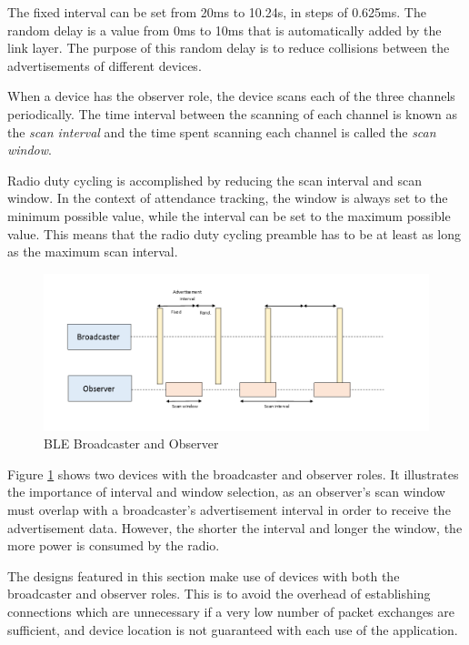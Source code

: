     The fixed interval can be set from 20ms to 10.24s, in steps of 0.625ms. The
    random delay is a value from 0ms to 10ms that is automatically added by the
    link layer. The purpose of this random delay is to reduce collisions between
    the advertisements of different devices.

    When a device has the observer role, the device scans each of the three
    channels periodically. The time interval between the scanning of each channel
    is known as the \textit{scan interval} and the time spent scanning each
    channel is called the \textit{scan window}.

    Radio duty cycling is accomplished by reducing the scan interval and scan window.
    In the context of attendance tracking, the window is always set to the minimum
    possible value, while the interval can be set to the maximum possible value. This
    means that the radio duty cycling preamble has to be at least as long
    as the maximum scan interval.

    \FloatBarrier
    \begin{figure}[ht]
      \includegraphics[width=\textwidth]{Images/chapter3/ble_intervals.png}
      \caption{BLE Broadcaster and Observer}
      \label{fig:intervals}
    \end{figure}
    \FloatBarrier

    Figure \ref{fig:intervals} shows two devices with the broadcaster and observer
    roles. It illustrates the importance of interval and window selection, as an
    observer's scan window must overlap with a broadcaster's advertisement
    interval in order to receive the advertisement data. However, the shorter
    the interval and longer the window, the more power is consumed by the radio.

    The designs featured in this section make use of devices with both the
    broadcaster and observer roles. This is to avoid the overhead of establishing
    connections which are unnecessary if a very low number of packet exchanges
    are sufficient, and device location is not guaranteed with each use of the
    application.

